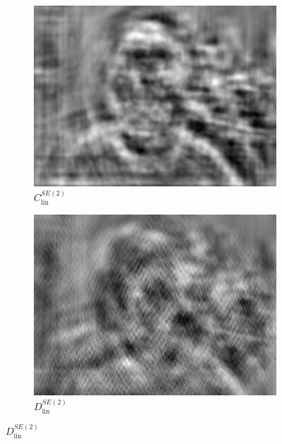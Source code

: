 \documentclass{article}
\begin{document}
\begin{figure}[h!]
\begin{subfigure}[b]{0.1\textwidth}
        \label{fig:mean and std of net24}
    \end{subfigure}
    \hspace{-1\baselineskip}
    \quad
    \begin{subfigure}[b]{0.1\textwidth}   
        \centering 
        \includegraphics[width=\textwidth]{plots/C_lin_SE2_conv.jpg}
        \caption{$C_{\text{lin}}^{SE(2)}$}%
           
        \label{fig:mean and std of net34}
    \end{subfigure}
    \hspace{-1\baselineskip}
    \quad
    \begin{subfigure}[b]{0.1\textwidth}   
        \centering 
        \includegraphics[width=\textwidth]{plots/D_lin_SE2_conv.jpg}
        \caption{$D_{\text{lin}}^{SE(2)}$}%
        

\end{subfigure}
\end{figure}
\end{document}
